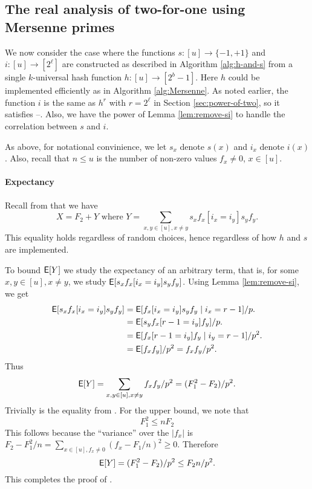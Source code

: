 \subsection{The real analysis of two-for-one using Mersenne primes}
We now consider the case where the functions $s:[u]\to\{-1,+1\}$ and
$i:[u]\to[2^\ell]$ are constructed as described in Algorithm
\ref{alg:h-and-s} from a single $k$-universal hash function
$h:[u]\to[2^b-1]$. Here $h$ could be implemented efficiently as
in Algorithm \ref{alg:Mersenne}. As noted earlier, the function
$i$ is the same as $h^r$ with $r=2^\ell$ in Section \ref{sec:power-of-two},
so it satisfies --. Also, we
have the power of Lemma \ref{lem:remove-si} to handle the correlation
between $s$ and $i$.

As above, for notational convinience, we let $s_x$ denote $s(x)$ and $i_x$ denote $i(x)$. Also, recall that $n\leq u$ is the number of non-zero values
$f_x\neq 0$, $x\in [u]$.



\paragraph{Expectancy}
Recall from  that
we have
\[X=F_2+Y\mbox{ where }Y=\sum_{x,y\in[u],x\neq y} s_x f_x[i_x=i_y]s_y f_y.\]
This equality holds regardless of random choices, hence regardless of
how $h$ and $s$ are implemented.

To bound $\operatorname*{\sf{E}}[Y]$ we study the expectancy of an arbitrary term, that is,
for some $x,y\in[u],x\neq y$, we study $\operatorname*{\sf{E}}[ s_x f_x[i_x=i_y]s_y f_y]$.
Using Lemma \ref{lem:remove-si}, we get 
\begin{align}
   \E[s_x f_x[i_x=i_y]s_y f_y]
   &=\E[f_x[i_x=i_y]s_y f_y\suchthat i_x=r-1]/p.\nonumber\\
   &=\E[s_y f_x[r-1=i_y]f_y]/p.\nonumber\\
   &=\E[f_x[r-1=i_y]f_y\suchthat i_y=r-1]/p^2.\nonumber\\
   &=\E[f_xf_y]/p^2=f_x f_y/p^2.\label{eq:E}
\end{align}
Thus
\[\operatorname*{\sf{E}}[Y]=\sum_{x,y\in[u],x\neq y} f_xf_y/p^2=(F_1^2-F_2)/p^2.\]
Trivially is the equality from . For the upper bound, we note that 
\begin{equation}\label{eq:F1F2}
   F_1^2\leq nF_2 
\end{equation}
This follows because the ``variance'' over the $|f_x|$ is
$F_2-F_1^2/n=\sum_{x\in[u], f_x\neq 0}(f_x-F_1/n)^2\geq 0$.
Therefore
\[\operatorname*{\sf{E}}[Y]=(F_1^2-F_2)/p^2\leq F_2n/p^2.\]
This completes the proof of .

